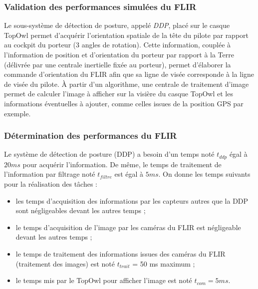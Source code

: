\subsubsection{Validation des performances simulées du FLIR}

Le sous-système de détection de posture, appelé \textit{DDP}, placé sur le casque TopOwl permet d'acquérir l'orientation
spatiale de la tête du pilote par rapport au cockpit du porteur (3 angles de rotation). Cette information, couplée
à l'information de position et d'orientation du porteur par rapport à la Terre (délivrée par une centrale inertielle fixée au porteur), permet d'élaborer la commande d'orientation du FLIR afin que sa ligne de visée corresponde
à la ligne de visée du pilote. À partir d'un algorithme, une centrale de traitement d'image permet de calculer
l'image à afficher sur la visière du casque TopOwl et les informations éventuelles à ajouter, comme celles issues
de la position GPS par exemple.

\subsubsection{Détermination des performances du FLIR}

Le système de détection de posture (DDP) a besoin d'un temps noté $t_{ddp}$ égal à $20 ms$ pour acquérir l'information. De même, le temps de traitement de l'information par filtrage noté $t_{filtre}$ est égal à $5 ms$.
On donne les temps suivants pour la réalisation des tâches :
\begin{itemize}
\item les temps d'acquisition des informations par les capteurs autres que la DDP sont négligeables devant les
autres temps ;
\item le temps d'acquisition de l'image par les caméras du FLIR est négligeable devant les autres temps ;
\item le temps de traitement des informations issues des caméras du FLIR (traitement des images) est noté
$t_{trait}$ = 50 ms maximum ;
\item le temps mis par le TopOwl pour afficher l'image est noté $t_{com} = 5 ms$.
\end{itemize}

